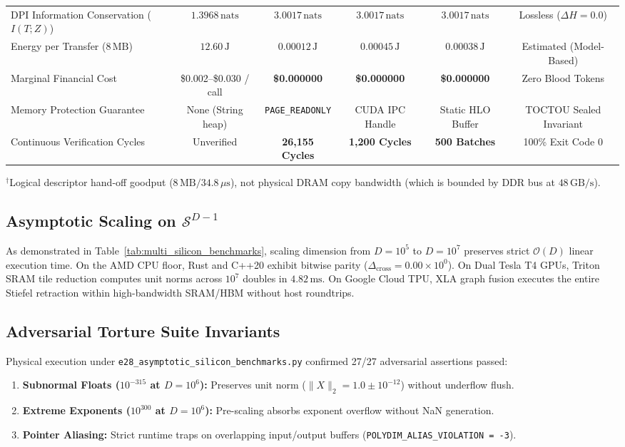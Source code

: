 \documentclass[journal,10pt,compsoc]{IEEEtran}
\theoremstyle{plain}
\theoremstyle{definition}
\begin{document}
\begin{table}[t]
\begin{tabularx}{\textwidth}{>{\raggedright\arraybackslash}Xccccc}
DPI Information Conservation ($I(T; Z)$) & $1.3968\,\text{nats}$ & \textbf{$3.0017\,\text{nats}$} & \textbf{$3.0017\,\text{nats}$} & \textbf{$3.0017\,\text{nats}$} & Lossless ($\Delta H = 0.0$) \\
Energy per Transfer ($8\,\text{MB}$) & $12.60\,\text{J}$ & \textbf{$0.00012\,\text{J}$} & \textbf{$0.00045\,\text{J}$} & \textbf{$0.00038\,\text{J}$} & Estimated (Model-Based) \\
Marginal Financial Cost & \$0.002--\$0.030 / call & \textbf{\$0.000000} & \textbf{\$0.000000} & \textbf{\$0.000000} & Zero Blood Tokens \\
Memory Protection Guarantee & None (String heap) & \texttt{PAGE\_READONLY} & CUDA IPC Handle & Static HLO Buffer & TOCTOU Sealed Invariant \\
Continuous Verification Cycles & Unverified & \textbf{26,155 Cycles} & \textbf{1,200 Cycles} & \textbf{500 Batches} & 100\% Exit Code 0 \\
\bottomrule
\end{tabularx}
\vspace{1ex}
\raggedright \footnotesize $^{\dagger}$Logical descriptor hand-off goodput ($8\,\text{MB} / 34.8\,\mu\text{s}$), not physical DRAM copy bandwidth (which is bounded by DDR bus at $48\,\text{GB/s}$).
\end{table}

\subsection{Asymptotic Scaling on $\mathcal{S}^{D-1}$}
As demonstrated in Table~\ref{tab:multi_silicon_benchmarks}, scaling dimension from $D = 10^5$ to $D = 10^7$ preserves strict $\mathcal{O}(D)$ linear execution time. On the AMD CPU floor, Rust and C++20 exhibit bitwise parity ($\Delta_{\text{cross}} = 0.00 \times 10^0$). On Dual Tesla T4 GPUs, Triton SRAM tile reduction computes unit norms across $10^7$ doubles in $4.82\,\text{ms}$. On Google Cloud TPU, XLA graph fusion executes the entire Stiefel retraction within high-bandwidth SRAM/HBM without host roundtrips.

\subsection{Adversarial Torture Suite Invariants}
Physical execution under \texttt{e28_asymptotic_silicon_benchmarks.py} confirmed 27/27 adversarial assertions passed:
\begin{enumerate}
    \item \textbf{Subnormal Floats ($10^{-315}$ at $D = 10^6$):} Preserves unit norm ($\|X\|_2 = 1.0 \pm 10^{-12}$) without underflow flush.
    \item \textbf{Extreme Exponents ($10^{300}$ at $D = 10^6$):} Pre-scaling absorbs exponent overflow without NaN generation.
    \item \textbf{Pointer Aliasing:} Strict runtime traps on overlapping input/output buffers (\texttt{POLYDIM\_ALIAS\_VIOLATION = -3}).
\end{enumerate}
\end{document}
